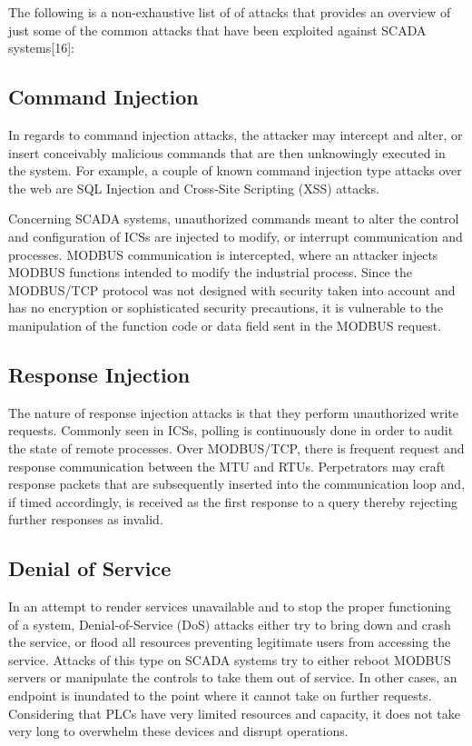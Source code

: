 \documentclass[11pt,]{article}
\begin{document}
The following is a non-exhaustive list of of attacks that provides an
overview of just some of the common attacks that have been exploited
against SCADA systems{[}16{]}:

\subsection{Command Injection}\label{command-injection}

In regards to command injection attacks, the attacker may intercept and
alter, or insert conceivably malicious commands that are then
unknowingly executed in the system. For example, a couple of known
command injection type attacks over the web are SQL Injection and
Cross-Site Scripting (XSS) attacks.

Concerning SCADA systems, unauthorized commands meant to alter the
control and configuration of ICSs are injected to modify, or interrupt
communication and processes. MODBUS communication is intercepted, where
an attacker injects MODBUS functions intended to modify the industrial
process. Since the MODBUS/TCP protocol was not designed with security
taken into account and has no encryption or sophisticated security
precautions, it is vulnerable to the manipulation of the function code
or data field sent in the MODBUS request.

\subsection{Response Injection}\label{response-injection}

The nature of response injection attacks is that they perform
unauthorized write requests. Commonly seen in ICSs, polling is
continuously done in order to audit the state of remote processes. Over
MODBUS/TCP, there is frequent request and response communication between
the MTU and RTUs. Perpetrators may craft response packets that are
subsequently inserted into the communication loop and, if timed
accordingly, is received as the first response to a query thereby
rejecting further responses as invalid.

\subsection{Denial of Service}\label{denial-of-service}

In an attempt to render services unavailable and to stop the proper
functioning of a system, Denial-of-Service (DoS) attacks either try to
bring down and crash the service, or flood all resources preventing
legitimate users from accessing the service. Attacks of this type on
SCADA systems try to either reboot MODBUS servers or manipulate the
controls to take them out of service. In other cases, an endpoint is
inundated to the point where it cannot take on further requests.
Considering that PLCs have very limited resources and capacity, it does
not take very long to overwhelm these devices and disrupt operations.
\end{document}
